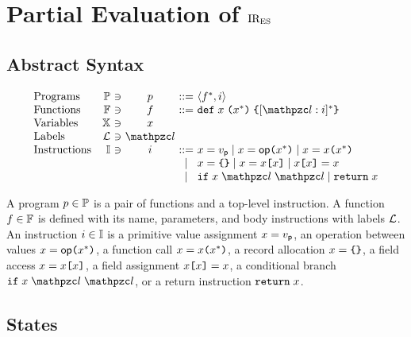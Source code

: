 \section{Partial Evaluation of $\text{IR}_\text{ES}$}\label{sec:formal}

\subsection{Abstract Syntax}

\[
  \begin{array}{lr@{~}c@{~}c@{~}c@{~}l}
    \text{Programs} & \progset &\ni& \prog &::=& \langle \func^*, \inst \rangle\\
    \text{Functions} & \funcset &\ni& \func &::=&
    \kwdef \; x \; \kwrl x^* \kwrr \; \kwcl [\lab: \inst]^* \kwcr\\
    \text{Variables} & \varset &\ni& x\\
    \text{Labels} & \labset &\ni& \lab\\
    \text{Instructions} & \instset &\ni& \inst &::=&
    x = \pval \mid
    x = \op \kwrl x^* \kwrr \mid
    x = x \kwrl x^* \kwrr\\
    &&&&\mid&
    x = \kwcl \kwcr \mid
    x = x \kwsl x \kwsr \mid
    x \kwsl x \kwsr = x\\
    &&&&\mid&
    \kwif \; x \; \lab \; \lab \mid
    \kwret \; x\\
  \end{array}
\]

A program $p \in \mathbb{P}$ is a pair of functions and a top-level
instruction.  A function $f \in \mathbb{F}$ is defined with its name,
parameters, and body instructions with labels $\mathcal{L}$.  An instruction $i
\in \mathbb{I}$ is
a primitive value assignment $x = v_{\textsf{p}}$,
an operation between values $x = \textsf{op} \texttt{(} x^* \texttt{)}$,
a function call $x = x \texttt{(} x^* \texttt{)}$,
a record allocation $x = \texttt{\{} \texttt{\}}$,
a field access $x = x \texttt{[} x \texttt{]}$,
a field assignment $x \texttt{[} x \texttt{]} = x$,
a conditional branch $\kwif \; x \; \lab \; \lab$,
or a return instruction $\texttt{return} \; x$.

\subsection{States}

